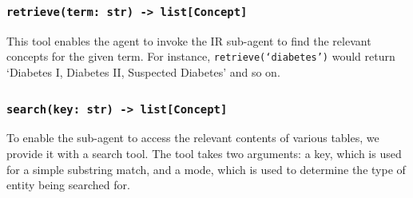 \documentclass[11pt]{article}
\begin{document}

\subsubsection*{\texttt{retrieve(term: str) -> list[Concept]}}
This tool enables the agent to invoke the IR sub-agent to find the relevant concepts for the given term.
For instance, \texttt{retrieve(`diabetes')} would return `Diabetes I, Diabetes II, Suspected Diabetes' and so on.

\subsubsection*{\texttt{search(key: str) -> list[Concept]}}
To enable the sub-agent to access the relevant contents of various tables, we provide it with a search tool.
The tool takes two arguments: a key, which is used for a simple substring match, and a mode, which is used to determine the type of entity being searched
for.
\end{document}
